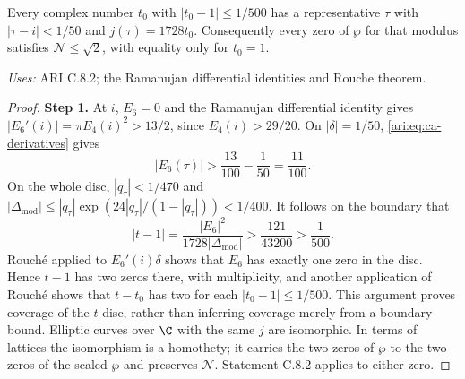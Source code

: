 \begin{proposition}\label{ari:C.8.3}
Every complex number $t_0$ with $|t_0-1|\le1/500$ has a
representative $\tau$ with $|\tau-i|<1/50$ and $j(\tau)=1728t_0$.
Consequently every zero of $\wp$ for that modulus satisfies
$\mathcal N\le\sqrt2$, with equality only for $t_0=1$.
\end{proposition}
\noindent\textit{Uses:} ARI C.8.2; the Ramanujan differential identities and Rouche theorem.\par
\begin{proof}
\noindent\textbf{Step 1.} At $i$, $E_6=0$ and the Ramanujan differential identity gives
$|E_6'(i)|=\pi E_4(i)^2>13/2$, since $E_4(i)>29/20$.
On $|\delta|=1/50$, \eqref{ari:eq:ca-derivatives} gives
\[
 |E_6(\tau)|>\frac{13}{100}-\frac1{50}=\frac{11}{100}.
\]
On the whole disc, $|q_\tau|<1/470$ and
$|\Delta_{\mathrm{mod}}|\le |q_\tau|\exp(24|q_\tau|/(1-|q_\tau|))<1/400$.
It follows on the boundary that
\[
 |t-1|=\frac{|E_6|^2}{1728|\Delta_{\mathrm{mod}}|}
 >\frac{121}{43200}>\frac1{500}.
\]
Rouch\'e applied to $E_6'(i)\delta$ shows that $E_6$ has
exactly one zero in the disc. Hence $t-1$ has two zeros there,
with multiplicity, and another application of Rouch\'e shows
that $t-t_0$ has two for each $|t_0-1|\le1/500$.
This argument proves coverage of the $t$-disc, rather than
inferring coverage merely from a boundary bound. Elliptic
curves over $\C$ with the same $j$ are isomorphic. In terms of
lattices the isomorphism is a homothety; it carries the two
zeros of $\wp$ to the two zeros of the scaled $\wp$ and
preserves $\mathcal N$. Statement C.8.2 applies to either zero.
\end{proof}

